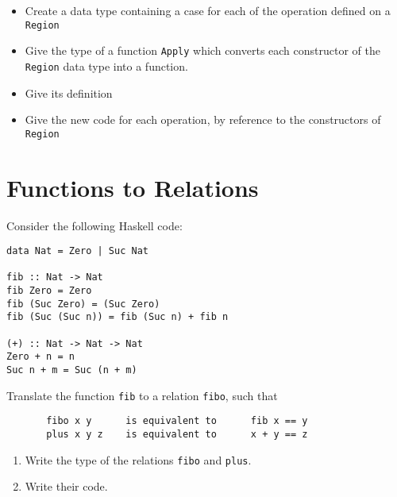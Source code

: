 \documentclass{article}
\newcommand{\answer}[1]{}
\begin{document}
\begin{itemize}
\item Create a data type containing a case for each of the operation defined on a \texttt{Region} 
\item Give the type of a function \texttt{Apply} which converts each constructor of the \texttt{Region} data type into a function. 
\item Give its definition 
\item Give the new code for each operation, by reference to the constructors of \texttt{Region} 
\end{itemize}

\answer{
  \begin{verbatim}
data Region = Outside Region
            | Intersect Region Region
            | Within Float Point

apply :: Region -> Point -> Bool
apply (Outside r) p       = not (apply r p)
apply (Intersect r1 r2) p = r1 p && r2 p
apply (Within range p1) p2 = norm2 (p1 .-. p2) <= range * range

outside :: Region -> Region
outside r = Outside r

intersect :: Region -> Region -> Region
intersect r1 r2 = Intersect r1 r2

withinRange :: Float -> Point -> Region
withinRange range p1 p2 = Within range p1 p2
  \end{verbatim}
}

\newpage
\section{Functions to Relations}

Consider the following Haskell code:
\begin{verbatim}
data Nat = Zero | Suc Nat

fib :: Nat -> Nat
fib Zero = Zero
fib (Suc Zero) = (Suc Zero)
fib (Suc (Suc n)) = fib (Suc n) + fib n

(+) :: Nat -> Nat -> Nat
Zero + n = n
Suc n + m = Suc (n + m)
\end{verbatim}

Translate the function \texttt{fib} to a relation \texttt{fibo}, such that
\begin{verbatim}
       fibo x y      is equivalent to      fib x == y
       plus x y z    is equivalent to      x + y == z
\end{verbatim}

\begin{enumerate}
\item Write the type of the relations \texttt{fibo} and
  \texttt{plus}. 
\item Write their code. 
\end{enumerate}
\end{document}
